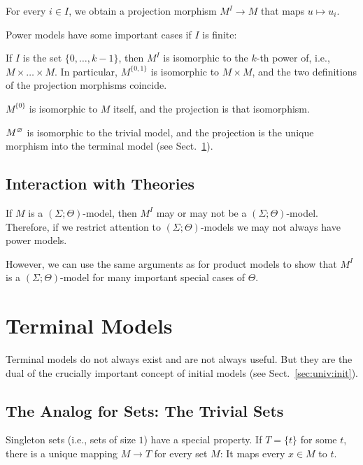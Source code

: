 For every $i\in I$, we obtain a projection morphism $M^I\to M$ that maps $u\mapsto u_i$.

\begin{example}
Power models have some important cases if $I$ is finite:
\begin{compactitem}
\item If $I$ is the set $\{0,\ldots,k-1\}$, then $M^I$ is isomorphic to the $k$-th power of, i.e., $M\times\ldots\times M$.
In particular, $M^{\{0,1\}}$ is isomorphic to $M\times M$, and the two definitions of the projection morphisms coincide.
\item $M^{\{0\}}$ is isomorphic to $M$ itself, and the projection is that isomorphism.
\item $M^\varnothing$ is isomorphic to the trivial model, and the projection is the unique morphism into the terminal model (see Sect.~\ref{sec:univ:term}).
\end{compactitem}
\end{example}

\subsection{Interaction with Theories}

If $M$ is a $(\Sigma;\Theta)$-model, then $M^I$ may or may not be a $(\Sigma;\Theta)$-model.
Therefore, if we restrict attention to $(\Sigma;\Theta)$-models we may not always have power models.

However, we can use the same arguments as for product models to show that $M^I$ is a $(\Sigma;\Theta)$-model for many important special cases of $\Theta$.

\section{Terminal Models}\label{sec:univ:term}

Terminal models do not always exist and are not always useful.
But they are the dual of the crucially important concept of initial models (see Sect.~\ref{sec:univ:init}).

\subsection{The Analog for Sets: The Trivial Sets}

Singleton sets (i.e., sets of size $1$) have a special property.
If $T=\{t\}$ for some $t$, there is a unique mapping $M\to T$ for every set $M$: It maps every $x\in M$ to $t$.

